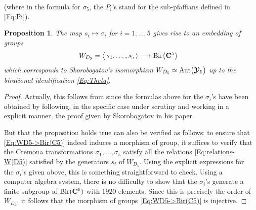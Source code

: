 \documentclass[11pt]{amsart}
\newtheorem{prop}[thm]{Proposition}
\begin{document}
(where in the formula for $\sigma_5$, the $P_i$'s stand for the sub-pfaffians defined in 
\eqref{Eq:Pi}).

\begin{prop} 
The map $s_i\longmapsto \sigma_i$ for $i=1,\ldots,5$ gives rise to an embedding of groups 
\begin{equation}
\label{Eq:WD5->Bir(C5)}
W_{D_5}=\big\langle\, s_1,\ldots,s_5\, \rangle \longrightarrow {\rm Bir}\big(  \mathbf C^5\big) 
\end{equation}
which corresponds to Skorobogatov's isomorphism $W_{D_5}\simeq {\rm Aut}\big( 
\boldsymbol{\mathcal Y}_5
\big)$ up to the birational identification \eqref{Eq:Theta}.
\end{prop} 

\begin{proof} Actually, this follows from \cite[Theorem 2.2]{Skorobogatov} since  the formulas above for the $\sigma_i$'s have been obtained by following, in the specific case under scrutiny and working in a explicit manner, the proof given by 
Skorobogatov  in his paper. 

But that the proposition holds true can also be verified as follows: 
to ensure that \eqref{Eq:WD5->Bir(C5)} indeed induces a morphism of group, it suffices to verify that the Cremona transformations $\sigma_1,\ldots,\sigma_5$
satisfy all the relations \eqref{Eq:relations-W(D5)} satisfied by the generators 
$s_i$ of $W_{D_5}$. Using the explicit expressions 
for the $\sigma_i$'s given above, this is something straightforward to check.  Using a computer algebra system, there is no difficulty to  show that the $\sigma_i$'s generate a finite subgroup of 
${\rm Bir}(\mathbf C^5)$ with $1920$ elements. Since this is precisely the order of $W_{D_5}$, it follows that the morphism of groups \eqref{Eq:WD5->Bir(C5)} is injective. 
\end{proof}
\end{document}
